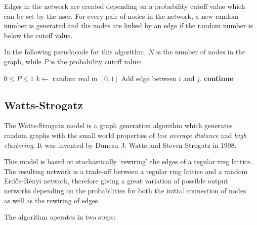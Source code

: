 \documentclass[a4paper,11pt,titlepage]{article}
\begin{document}
Edges in the network are created depending on a probability cutoff
value which can be set by the user. For every pair of nodes in the
network, a new random number is generated and the nodes are linked
by an edge if the random number is below the cutoff value.

In the following pseudocode for this algorithm, $N$ is the number
of nodes in the graph, while $P$ is the probability cutoff value:

\begin{algorithmic}
  \REQUIRE $0 \leq P \leq 1$
      \STATE $k \gets $ random real in $[0, 1]$
        \STATE Add edge between $i$ and $j$.
      \ELSE
        \STATE \textbf{continue}
      \ENDIF
    \ENDFOR
  \ENDFOR
\end{algorithmic}


\subsection{Watts-Strogatz}
The Watts-Strogatz model is a graph generation algorithm which
generates random graphs with the small world properties of
\emph{low average distance} and \emph{high clustering}.
It was invented by Duncan J. Watts and Steven Strogatz in 1998.

This model is based on stochastically `rewiring' the edges of a
regular ring lattice. The resulting network is a trade-off
between a regular ring lattice and a random Erd\H{o}s-R\'{e}nyi
network, therefore giving a great variation of possible output
networks depending on the probabilities for both the initial
connection of nodes as well as the rewiring of edges.

The algorithm operates in two steps:
\end{document}

